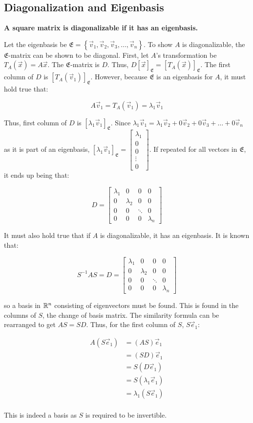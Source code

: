 \subsection{Diagonalization and Eigenbasis}

\textbf{A square matrix is diagonalizable if it has an eigenbasis.}

\noindent
Let the eigenbasis be $\mathfrak{E}=\left\{\vec v_1, \vec v_2, \vec v_3, \dots, \vec v_n\right\}$.
To show $A$ is diagonalizable, the $\mathfrak{E}$-matrix can be shown to be diagonal. First, let
$A$'s transformation be $T_A(\vec{x})=A\vec{x}$. The $\mathfrak{E}$-matrix is $D$. Thus, $\boxed{D[\vec x]_\mathfrak{E}=[T_A(\vec x)]_\mathfrak{E}}$.
The first column of $D$ is $[T_A(\vec{v}_1)]_\mathfrak{E}$. However, because $\mathfrak{E}$ is an eigenbasis for $A$,
it must hold true that:

\[A\vec v_1=T_A(\vec v_1)=\lambda_1 \vec v_1\]

\noindent
Thus, first column of $D$ is $[\lambda_1\vec{v}_1]_\mathfrak{E}$. Since $\lambda _1 \vec v_1=\lambda_1 \vec v_2+0\vec v_2+0\vec v_3+\dots+0\vec v_n$
as it is part of an eigenbasis, $[\lambda _1 \vec v_1]_\mathfrak{E}=\begin{bmatrix}\lambda_1\\0\\0\\ \vdots \\ 0 \end{bmatrix}$.
If repeated for all vectors in $\mathfrak{E}$, it ends up being that:

\[D=\begin{bmatrix}\lambda_1&0&0&0\\
    0&\lambda_2&0&0\\
    0&0&\ddots&0\\
    0&0&0&\lambda_n
\end{bmatrix}\]

It must also hold true that if $A$ is diagonalizable, it has an eigenbasis. It is known that:

\[S^{-1}AS=D=\begin{bmatrix}\lambda_1&0&0&0\\0&\lambda_2&0&0\\ 0&0&\ddots&0\\ 0&0&0&\lambda_n \end{bmatrix}\]

so a basis in $\mathbb{R}^n$ consisting of eigenvectors must be found. This is found in the columns of $S$, the change of basis matrix.
The similarity formula can be rearranged to get $AS=SD$. Thus, for the first column of $S$, $S\vec{e}_1$:

\begin{align*}
    A(S\vec e_1)&=(AS)\vec e_1\\
    &=(SD)\vec e_1\\
    &=S(D \vec e_1)\\
    &=S(\lambda_1 \vec e_1)\\
    &=\lambda_1 (S\vec e_1)\\    
\end{align*}

\noindent
This is indeed a basis as $S$ is required to be invertible.